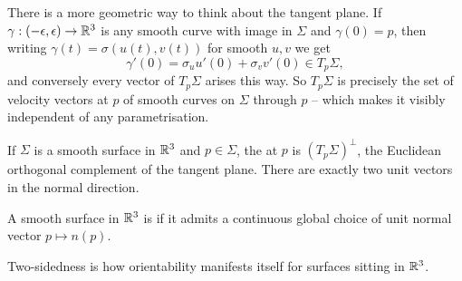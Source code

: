 \documentclass[a4paper]{scrartcl}
\begin{document}
There is a more geometric way to think about the tangent plane. If $\gamma: (-\epsilon, \epsilon) \rightarrow \mathbb{R}^3$ is any smooth curve with image in $\Sigma$ and $\gamma(0) = p$, then writing $\gamma(t) = \sigma(u(t), v(t))$ for smooth $u, v$ we get
$$
\gamma'(0) = \sigma_u u'(0) + \sigma_v v'(0) \in T_p \Sigma,
$$
and conversely every vector of $T_p \Sigma$ arises this way. So $T_p \Sigma$ is precisely the set of velocity vectors at $p$ of smooth curves on $\Sigma$ through $p$ -- which makes it visibly independent of any parametrisation.

\begin{definition}
    If $\Sigma$ is a smooth surface in $\mathbb{R}^3$ and $p \in \Sigma$, the  at $p$ is $(T_p \Sigma)^{\perp}$, the Euclidean orthogonal complement of the tangent plane. There are exactly two unit vectors in the normal direction.
\end{definition}

\begin{definition}
    A smooth surface in $\mathbb{R}^3$ is  if it admits a continuous global choice of unit normal vector $p \mapsto n(p)$.
\end{definition}

Two-sidedness is how orientability manifests itself for surfaces sitting in $\mathbb{R}^3$.
\end{document}
